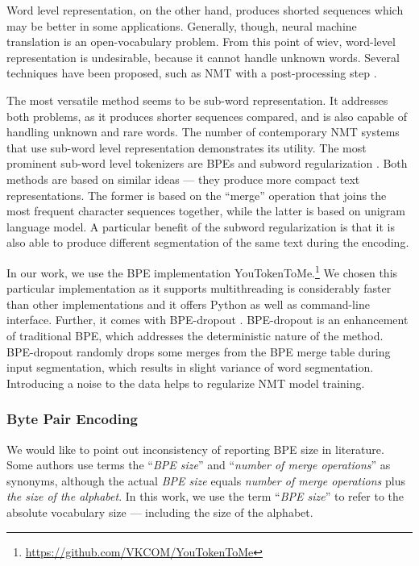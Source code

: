 Word level representation, on the other hand, produces shorted sequences which may be better in some applications. Generally, though, neural machine translation is an open-vocabulary problem. From this point of wiev, word-level representation is undesirable, because it cannot handle unknown words. Several techniques have been proposed, such as NMT with a post-processing step .

The most versatile method seems to be sub-word representation. It addresses both problems, as it produces shorter sequences compared, and is also capable of handling unknown and rare words. The number of contemporary NMT systems that use sub-word level representation demonstrates its utility. The most prominent sub-word level tokenizers are BPEs  and subword regularization . Both methods are based on similar ideas --- they produce more compact text representations. The former is based on the ``merge'' operation that joins the most frequent character sequences together, while the latter is based on unigram language model. A particular benefit of the subword regularization is that it is also able to produce different segmentation of the same text during the encoding.

In our work, we use the BPE implementation YouTokenToMe.\footnote{\url{https://github.com/VKCOM/YouTokenToMe}} We chosen this particular implementation as it supports multithreading is considerably faster than other implementations and it offers Python as well as command-line interface. Further, it comes with BPE-dropout . BPE-dropout is an enhancement of traditional BPE, which addresses the deterministic nature of the method. BPE-dropout randomly drops some merges from the BPE merge table during input segmentation, which results in slight variance of word segmentation. Introducing a noise to the data helps to regularize NMT model training.

\subsubsection{Byte Pair Encoding}
We would like to point out inconsistency of reporting BPE size in literature. Some authors use terms the ``\textit{BPE size}'' and ``\textit{number of merge operations}'' as synonyms, although the actual \textit{BPE size} equals \textit{number of merge operations} plus \textit{the size of the alphabet}. In this work, we use the term ``\textit{BPE size}'' to refer to the absolute vocabulary size --- including the size of the alphabet. 

